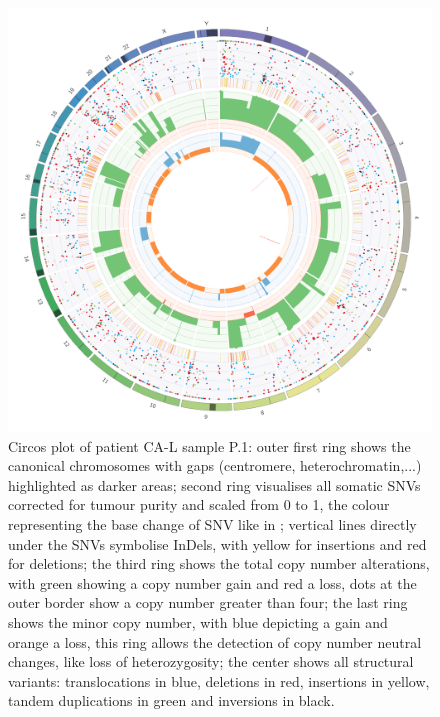 \begin{figure}[ht]
\centering
\includegraphics[width=.99\linewidth]{Figures/CASCADE/CA86/CA86-17B037524-1-S.circos.png}
\caption[Circos plot of patient CA-L sample P.1]{Circos plot of patient CA-L sample P.1: outer first ring shows the canonical chromosomes with gaps (centromere, heterochromatin,...) highlighted as darker areas; second ring visualises all somatic SNVs corrected for tumour purity and scaled from 0 to 1, the colour representing the base change of SNV like in \protect\textcite{Alexandrov2013}; vertical lines directly under the SNVs symbolise InDels, with yellow for insertions and red for deletions; the third ring shows the total copy number alterations, with green showing a copy number gain and red a loss, dots at the outer border show a copy number greater than four; the last ring shows the minor copy number, with blue depicting a gain and orange a loss, this ring allows the detection of copy number neutral changes, like loss of heterozygosity; the center shows all structural variants: translocations in blue, deletions in red, insertions in yellow, tandem duplications in green and inversions in black.} \label{fig:ca86.p1circos}
\end{figure}



